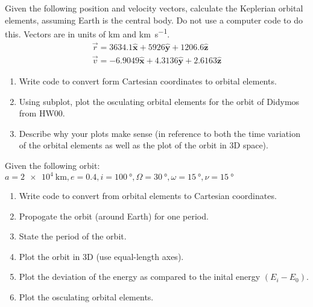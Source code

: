 \begin{hwkProblem}{1}{}

	Given the following position and velocity vectors, calculate the Keplerian orbital elements, assuming Earth is the central body. Do not use a computer code to do this. Vectors are in units of \unit{\km} and \unit{\km\per\s}.
	\begin{align*}
		\vec{r} = 3634.1 \bm{\hat{x}} + 5926 \bm{\hat{y}} + 1206.6 \bm{\hat{z}} \\
		\vec{v} = -6.9049 \bm{\hat{x}} + 4.3136 \bm{\hat{y}} + 2.6163 \bm{\hat{z}}
	\end{align*}

	\hwkSol

\end{hwkProblem}
\begin{hwkProblem}{2}{}

	\begin{enumerate}
		\item Write code to convert form Cartesian coordinates to orbital elements.
		\item Using subplot, plot the osculating orbital elements for the orbit of Didymos from HW00.
		\item Describe why your plots make sense (in reference to both the time variation of the orbital elements as well as the plot of the orbit in 3D space).
	\end{enumerate}

	\hwkSol

\end{hwkProblem}
\begin{hwkProblem}{3}{}
	
	Given the following orbit: \( a=\qty{2e4}{\km}, e=0.4, i=\qty{100}{\degree}, \Omega=\qty{30}{\degree}, \omega=\qty{15}{\degree}, \nu=\qty{15}{\degree} \)
	\begin{enumerate}
		\item Write code to convert from orbital elements to Cartesian coordinates.
		\item Propogate the orbit (around Earth) for one period.
		\item State the period of the orbit.
		\item Plot the orbit in 3D (use equal-length axes).
		\item Plot the deviation of the energy as compared to the inital energy \( \left( E_i - E_0 \right) \).
		\item Plot the osculating orbital elements.
	\end{enumerate}
	
	\hwkSol
	
\end{hwkProblem}
